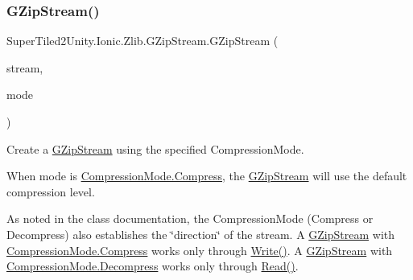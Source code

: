 \subsubsection{\texorpdfstring{G\+Zip\+Stream()}{GZipStream()}\hspace{0.1cm}{\footnotesize\ttfamily [1/4]}}
{\footnotesize\ttfamily Super\+Tiled2\+Unity.\+Ionic.\+Zlib.\+G\+Zip\+Stream.\+G\+Zip\+Stream (\begin{DoxyParamCaption}\item[{Stream}]{stream,  }\item[{\mbox{\hyperlink{namespace_super_tiled2_unity_1_1_ionic_1_1_zlib_ad5b7635d92497e1c905e5de82eb1c6b1}{Compression\+Mode}}}]{mode }\end{DoxyParamCaption})}



Create a {\ttfamily \mbox{\hyperlink{class_super_tiled2_unity_1_1_ionic_1_1_zlib_1_1_g_zip_stream}{G\+Zip\+Stream}}} using the specified {\ttfamily Compression\+Mode}. 

When mode is {\ttfamily \mbox{\hyperlink{namespace_super_tiled2_unity_1_1_ionic_1_1_zlib_ad5b7635d92497e1c905e5de82eb1c6b1a8fa4fcfcda70410e089984d5f51ae97d}{Compression\+Mode.\+Compress}}}, the {\ttfamily \mbox{\hyperlink{class_super_tiled2_unity_1_1_ionic_1_1_zlib_1_1_g_zip_stream}{G\+Zip\+Stream}}} will use the default compression level. 

As noted in the class documentation, the {\ttfamily Compression\+Mode} (Compress or Decompress) also establishes the \char`\"{}direction\char`\"{} of the stream. A {\ttfamily \mbox{\hyperlink{class_super_tiled2_unity_1_1_ionic_1_1_zlib_1_1_g_zip_stream}{G\+Zip\+Stream}}} with {\ttfamily \mbox{\hyperlink{namespace_super_tiled2_unity_1_1_ionic_1_1_zlib_ad5b7635d92497e1c905e5de82eb1c6b1a8fa4fcfcda70410e089984d5f51ae97d}{Compression\+Mode.\+Compress}}} works only through {\ttfamily \mbox{\hyperlink{class_super_tiled2_unity_1_1_ionic_1_1_zlib_1_1_g_zip_stream_a49032afb5806563236a5d53841abe2b8}{Write()}}}. A {\ttfamily \mbox{\hyperlink{class_super_tiled2_unity_1_1_ionic_1_1_zlib_1_1_g_zip_stream}{G\+Zip\+Stream}}} with {\ttfamily \mbox{\hyperlink{namespace_super_tiled2_unity_1_1_ionic_1_1_zlib_ad5b7635d92497e1c905e5de82eb1c6b1a6d2861192fdf4370bcf95c099be0f2f0}{Compression\+Mode.\+Decompress}}} works only through {\ttfamily \mbox{\hyperlink{class_super_tiled2_unity_1_1_ionic_1_1_zlib_1_1_g_zip_stream_a772b5013a585850ffaf8be4aa7f3dbcf}{Read()}}}. 

